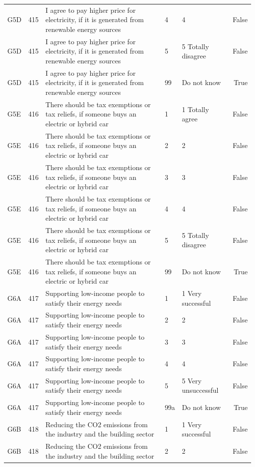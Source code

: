 \begin{tabular}{lrlllr}
G5D & 415 & I agree to pay higher price for electricity, if it is generated from renewable energy sources & 4 & 4 & False \\
G5D & 415 & I agree to pay higher price for electricity, if it is generated from renewable energy sources & 5 & 5 Totally disagree & False \\
G5D & 415 & I agree to pay higher price for electricity, if it is generated from renewable energy sources & 99 & Do not know & True \\
G5E & 416 & There should be tax exemptions or tax reliefs, if someone buys an electric or hybrid car & 1 & 1  Totally agree & False \\
G5E & 416 & There should be tax exemptions or tax reliefs, if someone buys an electric or hybrid car & 2 & 2 & False \\
G5E & 416 & There should be tax exemptions or tax reliefs, if someone buys an electric or hybrid car & 3 & 3 & False \\
G5E & 416 & There should be tax exemptions or tax reliefs, if someone buys an electric or hybrid car & 4 & 4 & False \\
G5E & 416 & There should be tax exemptions or tax reliefs, if someone buys an electric or hybrid car & 5 & 5 Totally disagree & False \\
G5E & 416 & There should be tax exemptions or tax reliefs, if someone buys an electric or hybrid car & 99 & Do not know & True \\
G6A & 417 & Supporting low-income people to satisfy their energy needs & 1 & 1 Very successful & False \\
G6A & 417 & Supporting low-income people to satisfy their energy needs & 2 & 2 & False \\
G6A & 417 & Supporting low-income people to satisfy their energy needs & 3 & 3 & False \\
G6A & 417 & Supporting low-income people to satisfy their energy needs & 4 & 4 & False \\
G6A & 417 & Supporting low-income people to satisfy their energy needs & 5 & 5 Very unsuccessful & False \\
G6A & 417 & Supporting low-income people to satisfy their energy needs & 99a & Do not know & True \\
G6B & 418 & Reducing the CO2 emissions from the industry and the building sector & 1 & 1 Very successful & False \\
G6B & 418 & Reducing the CO2 emissions from the industry and the building sector & 2 & 2 & False \\

\end{tabular}
